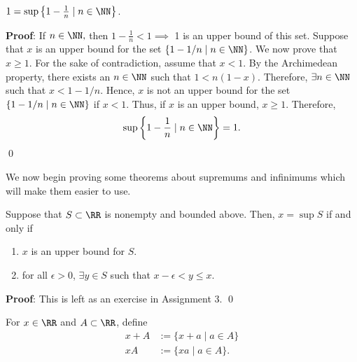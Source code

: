 \begin{theorem}
$1 = \sup\left\{1- \frac{1}{n}\mid n\in \NN\right\}$.
\end{theorem}
\textbf{Proof}: If $n\in \NN,$ then $1-\frac{1}{n}<1\implies$ 1 is an upper bound of this set. Suppose that $x$ is an upper bound for the set $\{1-1/n \mid n\in \NN\}$. We now prove that $x\geq 1$. For the sake of contradiction, assume that $x<1$. By the Archimedean property, there exists an $n\in \NN$ such that $1<n(1-x)$. Therefore, $\exists n\in \NN$ such that $x<1-1/n$. Hence, $x$ is not an upper bound for the set $\{1-1/n\mid n\in \NN\}$ if $x<1$. Thus, if $x$ is an upper bound, $x\geq 1$. Therefore, 
\[
\sup \left\{1-\frac{1}{n}\mid n\in \NN\right\} = 1.
\]
\qed 

We now begin proving some theorems about supremums and infinimums which will make them easier to use.
\begin{theorem}
Suppose that $S\subset \RR$ is nonempty and bounded above. Then, $x= \sup S$ if and only if 
\begin{enumerate}
    \item $x$ is an upper bound for $S$.
    \item for all $\epsilon>0$, $\exists y\in S$ such that $x-\epsilon<y\leq x$.
\end{enumerate}
\end{theorem}
\textbf{Proof}: This is left as an exercise in Assignment 3. \qed

\begin{notation}
For $x\in \RR$ and $A\subset \RR$, define
\begin{align*}
    x+A &:= \{x+a\mid a\in A\} \\
    xA &:= \{xa\mid a\in A\}.
\end{align*}
\end{notation}

